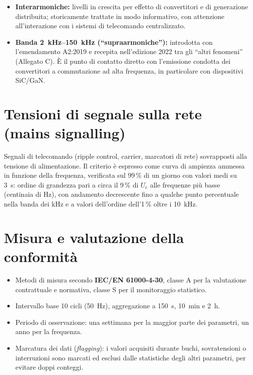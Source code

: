\documentclass[11pt,a4paper]{article}
\newcommand{\Uc}{U_{\mathrm{c}}}
\begin{document}
\begin{itemize}[itemsep=2pt]
  \item \textbf{Interarmoniche:} livelli in crescita per effetto di convertitori e
        di generazione distribuita; storicamente trattate in modo informativo,
        con attenzione all'interazione con i sistemi di telecomando centralizzato.
  \item \textbf{Banda \SIrange{2}{150}{kHz} (``supraarmoniche''):} introdotta con
        l'emendamento A2:2019 e recepita nell'edizione 2022 tra gli
        ``altri fenomeni'' (Allegato C). È il punto di contatto diretto con
        l'emissione condotta dei convertitori a commutazione ad alta frequenza,
        in particolare con dispositivi SiC/GaN.
\end{itemize}

\section{Tensioni di segnale sulla rete (mains signalling)}

Segnali di telecomando (ripple control, carrier, marcatori di rete) sovrapposti
alla tensione di alimentazione. Il criterio è espresso come curva di ampiezza
ammessa in funzione della frequenza, verificata sul 99\,\% di un giorno con
valori medi su \SI{3}{\second}: ordine di grandezza pari a circa il 9\,\% di $\Uc$
alle frequenze più basse (centinaia di Hz), con andamento decrescente fino a
qualche punto percentuale nella banda dei kHz e a valori dell'ordine dell'1\,\%
oltre i \SI{10}{kHz}.

\section{Misura e valutazione della conformità}

\begin{itemize}[itemsep=2pt]
  \item Metodi di misura secondo \textbf{IEC/EN 61000-4-30}, classe A per la
        valutazione contrattuale e normativa, classe S per il monitoraggio statistico.
  \item Intervallo base 10 cicli (\SI{50}{Hz}), aggregazione a \SI{150}{\second},
        \SI{10}{\minute} e \SI{2}{\hour}.
  \item Periodo di osservazione: una settimana per la maggior parte dei parametri,
        un anno per la frequenza.
  \item Marcatura dei dati (\emph{flagging}): i valori acquisiti durante buchi,
        sovratensioni o interruzioni sono marcati ed esclusi dalle statistiche
        degli altri parametri, per evitare doppi conteggi.
\end{itemize}
\end{document}

